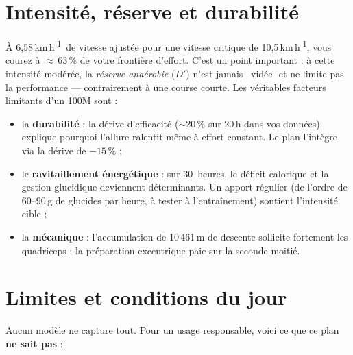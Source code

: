 \documentclass{locomotionreport}
\newcommand{\kmh}{\,km\,h\textsuperscript{-1}}
\begin{document}
\section{Intensit\'e, r\'eserve et durabilit\'e}

\`A 6,58\kmh\ de vitesse ajust\'ee pour une vitesse critique de 10,5\kmh, vous courez \`a $\approx$\,63\,\% de votre
fronti\`ere d'effort. C'est un point important : \`a cette intensit\'e mod\'er\'ee, la \emph{r\'eserve ana\'erobie}
(\(D'\)) n'est jamais \og~vid\'ee\,\fg\ et ne limite pas la performance --- contrairement \`a une course courte.
Les v\'eritables facteurs limitants d'un 100M sont :
\begin{itemize}[leftmargin=1.4em]
\item la \textbf{durabilit\'e} : la d\'erive d'efficacit\'e ($\sim$20\,\% sur 20\,h dans vos donn\'ees) explique
pourquoi l'allure ralentit m\^eme \`a effort constant. Le plan l'int\`egre via la d\'erive de \(-15\,\%\) ;
\item le \textbf{ravitaillement \'energ\'etique} : sur 30~heures, le d\'eficit calorique et la gestion glucidique
deviennent d\'eterminants. Un apport r\'egulier (de l'ordre de 60--90\,g de glucides par heure, \`a tester \`a
l'entra\^inement) soutient l'intensit\'e cible ;
\item la \textbf{m\'ecanique} : l'accumulation de 10\,461\,m de descente sollicite fortement les quadriceps ;
la pr\'eparation excentrique paie sur la seconde moiti\'e.
\end{itemize}

\section{Limites et conditions du jour}

Aucun mod\`ele ne capture tout. Pour un usage responsable, voici ce que ce plan \textbf{ne sait pas} :
\end{document}
